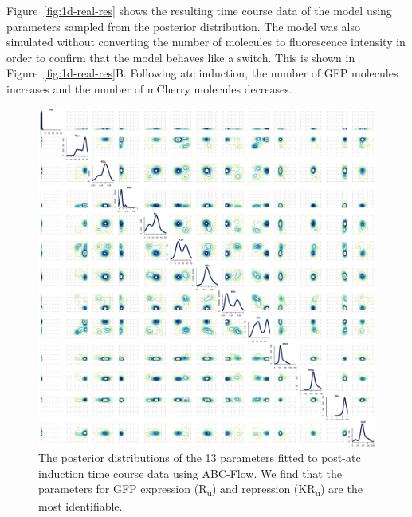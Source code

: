 Figure~\ref{fig:1d-real-res} shows the resulting time course data of the model using parameters sampled from the posterior distribution. The model was also simulated without converting the number of molecules to fluorescence intensity in order to confirm that the model behaves like a switch. This is shown in Figure~\ref{fig:1d-real-res}B. Following \acrshort{atc} induction, the number of GFP molecules increases and the number of mCherry molecules decreases. 

\begin{figure}[tb]
\centerfloat
	\includegraphics[width=\textwidth]{../../chapters/chapterABCFlow/images/real_data_stuff/posterior2D_pop10_100p.pdf}
	\caption[Posterior distribution of inferred parameters for post-\acrshort{atc} induction of the toggle switch]{\label{fig:1atc-post} The posterior distributions of the 13 parameters fitted to post-\acrshort{atc} induction time course data using ABC-Flow. We find that the parameters for GFP expression (R\textsubscript{u}) and repression (KR\textsubscript{u}) are the most identifiable.}
\end{figure}





